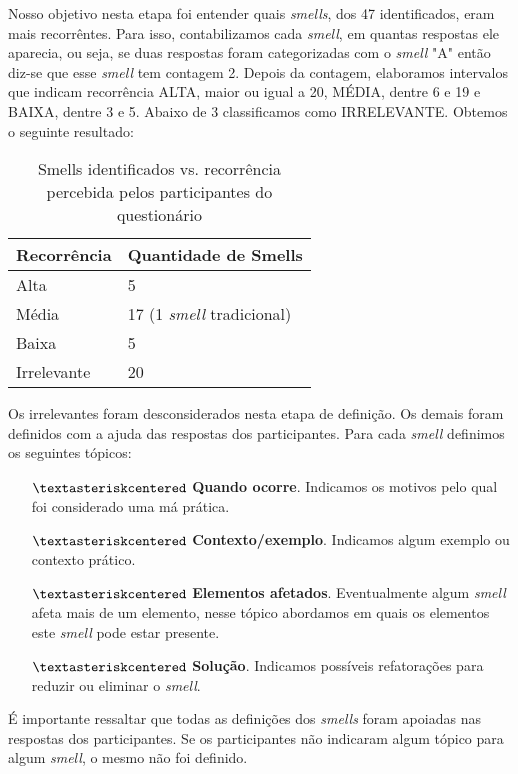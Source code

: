 Nosso objetivo nesta etapa foi entender quais \textit{smells}, dos 47 identificados, eram mais recorr\^entes. Para isso, contabilizamos cada \textit{smell}, em quantas respostas ele aparecia, ou seja, se duas respostas foram categorizadas com o \textit{smell} "A" ent\~ao diz-se que esse \textit{smell} tem contagem 2. Depois da contagem, elaboramos intervalos que indicam recorr\^encia ALTA, maior ou igual a 20, M\'EDIA, dentre 6 e 19 e BAIXA, dentre 3 e 5. Abaixo de 3 classificamos como IRRELEVANTE. Obtemos o seguinte resultado:

\begin{table}[h]
\centering
\caption{Smells identificados vs. recorr\^encia percebida pelos participantes do question\'ario}
\begin{tabular}{p{3cm}|p{4cm}}
\textbf{Recorr\^encia} & \textbf{Quantidade de Smells} \\
\hline
Alta  			& 5 \\
M\'edia 		& 17 (1 \textit{smell} tradicional) \\
Baixa			& 5 \\
Irrelevante 	& 20 \\
\end{tabular}
\label{tab:DadosDemograficos2}
\end{table}

Os irrelevantes foram desconsiderados nesta etapa de defini\c{c}\~ao. Os demais foram definidos com a ajuda das respostas dos participantes. Para cada \textit{smell} definimos os seguintes t\'opicos: 

\begin{itemize} 
	\item[$\textasteriskcentered$] \textbf{Quando ocorre}. Indicamos os motivos pelo qual foi considerado uma m\'a pr\'atica.   
	\item[$\textasteriskcentered$] \textbf{Contexto/exemplo}. Indicamos algum exemplo ou contexto pr\'atico. 
	\item[$\textasteriskcentered$] \textbf{Elementos afetados}. Eventualmente algum \textit{smell} afeta mais de um elemento, nesse t\'opico abordamos em quais os elementos este \textit{smell} pode estar presente. 
	\item[$\textasteriskcentered$] \textbf{Solu\c{c}\~ao}. Indicamos poss\'iveis refatora\c{c}\~oes para reduzir ou eliminar o \textit{smell}. \\
\end{itemize}

\'E importante ressaltar que todas as defini\c{c}\~oes dos \textit{smells} foram apoiadas nas respostas dos participantes. Se os participantes n\~ao indicaram algum t\'opico para algum \textit{smell}, o mesmo n\~ao foi definido. \\
